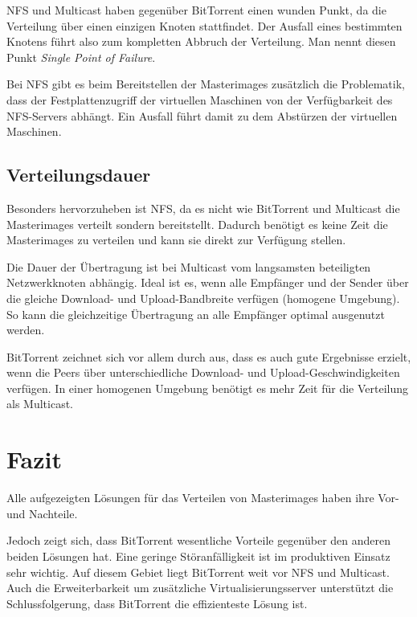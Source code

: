 NFS und Multicast haben gegenüber BitTorrent einen wunden Punkt, da die Verteilung über einen einzigen Knoten stattfindet. Der Ausfall eines bestimmten Knotens führt also zum kompletten Abbruch der Verteilung. Man nennt diesen Punkt \textit{Single Point of Failure}. 

Bei NFS gibt es beim Bereitstellen der Masterimages zusätzlich die Problematik, dass der Festplattenzugriff der virtuellen Maschinen von der Verfügbarkeit des NFS-Servers abhängt. Ein Ausfall führt damit zu dem Abstürzen der virtuellen Maschinen.


\subsection{Verteilungsdauer}
Besonders hervorzuheben ist NFS, da es nicht wie BitTorrent und Multicast die Masterimages verteilt sondern bereitstellt. Dadurch benötigt es keine Zeit die Masterimages zu verteilen und kann sie direkt zur Verfügung stellen. 

Die Dauer der Übertragung ist bei Multicast vom langsamsten beteiligten Netzwerkknoten abhängig. Ideal ist es, wenn alle Empfänger und der Sender über die gleiche Download- und Upload-Bandbreite verfügen (homogene Umgebung). So kann die gleichzeitige Übertragung an alle Empfänger optimal ausgenutzt werden.

BitTorrent zeichnet sich vor allem durch aus, dass es auch gute Ergebnisse erzielt, wenn die Peers über unterschiedliche Download- und Upload-Geschwindigkeiten verfügen. In einer homogenen Umgebung benötigt es mehr Zeit für die Verteilung als Multicast. 

\section{Fazit}

Alle aufgezeigten Lösungen für das Verteilen von Masterimages haben ihre Vor- und Nachteile. 
\begin{comment} Wie der Vergleich zeigt sind alle 3 für den produktiven Einsatz geeignet.\end{comment}
Jedoch zeigt sich, dass BitTorrent wesentliche Vorteile gegenüber den anderen beiden Lösungen hat. Eine geringe Störanfälligkeit ist im produktiven Einsatz sehr wichtig. Auf diesem Gebiet liegt BitTorrent weit vor NFS und Multicast. Auch die Erweiterbarkeit um zusätzliche Virtualisierungsserver unterstützt die Schlussfolgerung, dass BitTorrent die effizienteste Lösung ist.